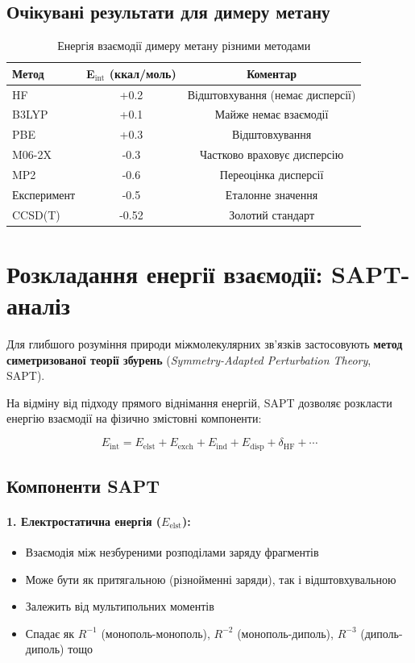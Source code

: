 \subsection{Очікувані результати для димеру метану}

\begin{table}[h]
\centering
\begin{tabular}{lcc}
\hline
\textbf{Метод} & \textbf{E$_{\text{int}}$ (ккал/моль)} & \textbf{Коментар} \\
\hline
HF              & +0.2  & Відштовхування (немає дисперсії) \\
B3LYP           & +0.1  & Майже немає взаємодії \\
PBE             & +0.3  & Відштовхування \\
M06-2X          & -0.3  & Частково враховує дисперсію \\
MP2             & -0.6  & Переоцінка дисперсії \\
\hline
Експеримент     & -0.5  & Еталонне значення \\
CCSD(T)         & -0.52 & Золотий стандарт \\
\hline
\end{tabular}
\caption{Енергія взаємодії димеру метану різними методами}
\end{table}

\section{Розкладання енергії взаємодії: SAPT-аналіз}

Для глибшого розуміння природи міжмолекулярних зв'язків застосовують \textbf{метод симетризованої теорії збурень} (\textit{Symmetry-Adapted Perturbation Theory}, SAPT).

На відміну від підходу прямого віднімання енергій, SAPT дозволяє розкласти енергію взаємодії на фізично змістовні компоненти:

\[
E_{\text{int}} = E_{\text{elst}} + E_{\text{exch}} + E_{\text{ind}} + E_{\text{disp}} + \delta_{\text{HF}} + \cdots
\]

\subsection{Компоненти SAPT}

\paragraph{1. Електростатична енергія (\(E_{\text{elst}}\)):}
\begin{itemize}
    \item Взаємодія між незбуреними розподілами заряду фрагментів
    \item Може бути як притягальною (різнойменні заряди), так і відштовхувальною
    \item Залежить від мультипольних моментів
    \item Спадає як \(R^{-1}\) (монополь-монополь), \(R^{-2}\) (монополь-диполь), \(R^{-3}\) (диполь-диполь) тощо
\end{itemize}

